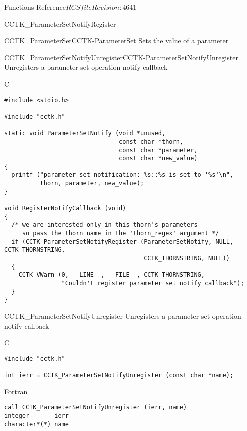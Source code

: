 \begin{cactuspart}{ Functions Reference}{$RCSfile$}{$Revision: 4641 $}
\begin{FunctionDescription}{CCTK\_ParameterSetNotifyRegister}
\begin{SeeAlsoSection}
\begin{SeeAlso2}{CCTK\_ParameterSet}{CCTK-ParameterSet}
  Sets the value of a parameter
\end{SeeAlso2}
\begin{SeeAlso2}{CCTK\_ParameterSetNotifyUnregister}{CCTK-ParameterSetNotifyUnregister}
  Unregisters a parameter set operation notify callback
\end{SeeAlso2}
\end{SeeAlsoSection}

\begin{ExampleSection}
\begin{Example}{C}
\begin{verbatim}
#include <stdio.h>

#include "cctk.h"

static void ParameterSetNotify (void *unused,
                                const char *thorn,
                                const char *parameter,
                                const char *new_value)
{
  printf ("parameter set notification: %s::%s is set to '%s'\n",
          thorn, parameter, new_value);
}

void RegisterNotifyCallback (void)
{
  /* we are interested only in this thorn's parameters
     so pass the thorn name in the 'thorn_regex' argument */
  if (CCTK_ParameterSetNotifyRegister (ParameterSetNotify, NULL, CCTK_THORNSTRING,
                                       CCTK_THORNSTRING, NULL))
  {
    CCTK_VWarn (0, __LINE__, __FILE__, CCTK_THORNSTRING,
                "Couldn't register parameter set notify callback");
  }
}
\end{verbatim}
\end{Example}
\end{ExampleSection}
\end{FunctionDescription}


\begin{FunctionDescription}{CCTK\_ParameterSetNotifyUnregister}
\label{CCTK-ParameterSetNotifyUnregister}
Unregisters a parameter set operation notify callback

\begin{SynopsisSection}
\begin{Synopsis}{C}
\begin{verbatim}
#include "cctk.h"

int ierr = CCTK_ParameterSetNotifyUnregister (const char *name);
\end{verbatim}
\end{Synopsis}
\begin{Synopsis}{Fortran}
\begin{verbatim}
call CCTK_ParameterSetNotifyUnregister (ierr, name)
integer       ierr
character*(*) name
\end{verbatim}
\end{Synopsis}
\end{SynopsisSection}


\end{FunctionDescription}
\end{cactuspart}
